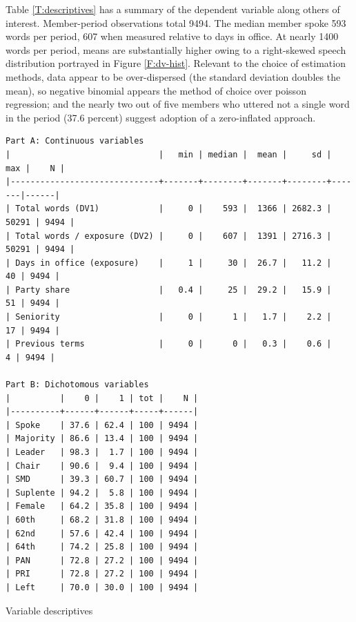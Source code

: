 \documentclass[letter,12pt]{article}
\begin{document}
Table \ref{T:descriptives} has a summary of the dependent variable along others of interest. Member-period observations total 9494. The median member spoke 593 words per period, 607 when measured relative to days in office. At nearly 1400 words per period, means are substantially higher owing to a right-skewed speech distribution portrayed in Figure \ref{F:dv-hist}. Relevant to the choice of estimation methods, data appear to be over-dispersed (the standard deviation doubles the mean), so negative binomial appears the method of choice over poisson regression; and the nearly two out of five members who uttered not a single word in the period (37.6 percent) suggest adoption of a zero-inflated approach.

\begin{table}
  \begin{tiny}
    \begin{verbatim}
Part A: Continuous variables
|                              |   min | median |  mean |     sd |   max |    N |
|------------------------------+-------+--------+-------+--------+-------|------|
| Total words (DV1)            |     0 |    593 |  1366 | 2682.3 | 50291 | 9494 |
| Total words / exposure (DV2) |     0 |    607 |  1391 | 2716.3 | 50291 | 9494 |
| Days in office (exposure)    |     1 |     30 |  26.7 |   11.2 |    40 | 9494 |
| Party share                  |   0.4 |     25 |  29.2 |   15.9 |    51 | 9494 |
| Seniority                    |     0 |      1 |   1.7 |    2.2 |    17 | 9494 |
| Previous terms               |     0 |      0 |   0.3 |    0.6 |     4 | 9494 |

Part B: Dichotomous variables
|          |    0 |    1 | tot |    N |
|----------+------+------+-----+------|
| Spoke    | 37.6 | 62.4 | 100 | 9494 |
| Majority | 86.6 | 13.4 | 100 | 9494 |
| Leader   | 98.3 |  1.7 | 100 | 9494 |
| Chair    | 90.6 |  9.4 | 100 | 9494 |
| SMD      | 39.3 | 60.7 | 100 | 9494 |
| Suplente | 94.2 |  5.8 | 100 | 9494 |
| Female   | 64.2 | 35.8 | 100 | 9494 |
| 60th     | 68.2 | 31.8 | 100 | 9494 |
| 62nd     | 57.6 | 42.4 | 100 | 9494 |
| 64th     | 74.2 | 25.8 | 100 | 9494 |
| PAN      | 72.8 | 27.2 | 100 | 9494 |
| PRI      | 72.8 | 27.2 | 100 | 9494 |
| Left     | 70.0 | 30.0 | 100 | 9494 |
    \end{verbatim}
  \end{tiny}
\caption{Variable descriptives}\label{T:descriptives}
\end{table}
\end{document}

